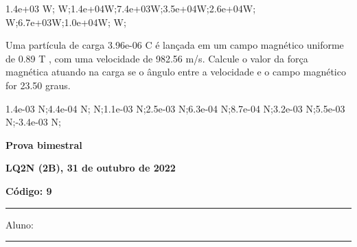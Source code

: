 \documentclass[12pt, addpoints]{exam}
\begin{document}
\begin{questions}
\begin{multicols*}{2}
\begin{oneparchoices}
\choice 1.4e+03 W; W;\choice 1.4e+04W;\choice 7.4e+03W;\choice 3.5e+04W;\choice 2.6e+04W; W;\choice 6.7e+03W;\choice 1.0e+04W; W;\end{oneparchoices}
\question[20] Uma partícula de carga 3.96e-06 C é lançada em um campo magnético uniforme de    0.89 T , com uma velocidade de 982.56 m/s. Calcule o valor da força magnética atuando na carga se o ângulo entre a velocidade e o campo magnético for   23.50 graus.

\begin{oneparchoices}
\choice 1.4e-03 N;\choice 4.4e-04 N; N;\choice 1.1e-03 N;\choice 2.5e-03 N;\choice 6.3e-04 N;\choice 8.7e-04 N;\choice 3.2e-03 N;\choice 5.5e-03 N;\choice -3.4e-03 N;\end{oneparchoices}
\end{multicols*}
\end{questions}
\newpage
        \begin{minipage}[b]{0.75\linewidth}
            \begin{flushleft}
                {\bf \large Prova bimestral}
            \end{flushleft}
            \begin{flushleft}
                {\bf \large LQ2N (2B), 31 de outubro de 2022}
            \end{flushleft}
        \end{minipage}
        \begin{minipage}[b]{0.20\linewidth}
            \begin{flushright}
                {\bf \large Código: 9}
            \end{flushright}
        \end{minipage}
        \vspace{0.5cm} \hrule \vspace{0.5cm}
        \begin{minipage}{0.75\linewidth}
            Aluno:
        \end{minipage}
        \vspace{0.5cm} \hrule \vspace{0.5cm}
\end{document}
